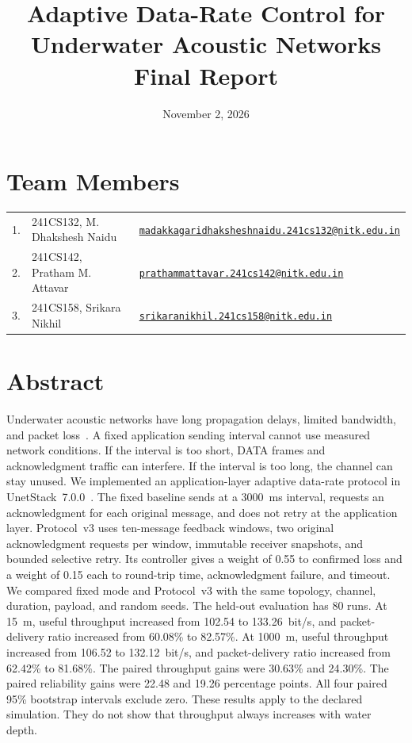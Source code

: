 \documentclass[11pt]{article}
\title{\textbf{Adaptive Data-Rate Control for Underwater Acoustic Networks}\\[4pt]
\large Final Report}
\date{November 2, 2026}
\begin{document}
\maketitle

\section*{Team Members}
\noindent\small
\begin{tabularx}{\linewidth}{@{}l l X@{}}
1. & 241CS132, M. Dhakshesh Naidu & \href{mailto:madakkagaridhaksheshnaidu.241cs132@nitk.edu.in}{\nolinkurl{madakkagaridhaksheshnaidu.241cs132@nitk.edu.in}} \\
2. & 241CS142, Pratham M. Attavar & \href{mailto:prathammattavar.241cs142@nitk.edu.in}{\nolinkurl{prathammattavar.241cs142@nitk.edu.in}} \\
3. & 241CS158, Srikara Nikhil & \href{mailto:srikaranikhil.241cs158@nitk.edu.in}{\nolinkurl{srikaranikhil.241cs158@nitk.edu.in}}
\end{tabularx}
\normalsize

\section*{Abstract}
\noindent
Underwater acoustic networks have long propagation delays, limited bandwidth, and packet loss~\cite{akyildiz2005,casari2011}.
A fixed application sending interval cannot use measured network conditions.
If the interval is too short, DATA frames and acknowledgment traffic can interfere.
If the interval is too long, the channel can stay unused.
We implemented an application-layer adaptive data-rate protocol in UnetStack~7.0.0~\cite{chitre2014,unethandbook}.
The fixed baseline sends at a 3000~ms interval, requests an acknowledgment for each original message, and does not retry at the application layer.
Protocol~v3 uses ten-message feedback windows, two original acknowledgment requests per window, immutable receiver snapshots, and bounded selective retry.
Its controller gives a weight of 0.55 to confirmed loss and a weight of 0.15 each to round-trip time, acknowledgment failure, and timeout.
We compared fixed mode and Protocol~v3 with the same topology, channel, duration, payload, and random seeds.
The held-out evaluation has 80 runs.
At 15~m, useful throughput increased from 102.54 to 133.26~bit/s, and packet-delivery ratio increased from 60.08\% to 82.57\%.
At 1000~m, useful throughput increased from 106.52 to 132.12~bit/s, and packet-delivery ratio increased from 62.42\% to 81.68\%.
The paired throughput gains were 30.63\% and 24.30\%.
The paired reliability gains were 22.48 and 19.26 percentage points.
All four paired 95\% bootstrap intervals exclude zero.
These results apply to the declared simulation.
They do not show that throughput always increases with water depth.
\end{document}
